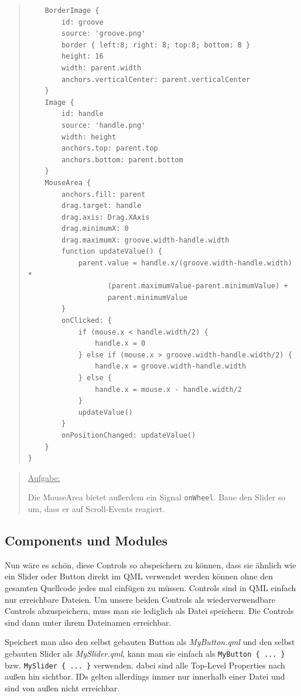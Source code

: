\documentclass[a4paper]{article}
\begin{document}
\begin{quote}
\begin{verbatim}
    BorderImage {
        id: groove
        source: 'groove.png'
        border { left:8; right: 8; top:8; bottom: 8 }
        height: 16
        width: parent.width
        anchors.verticalCenter: parent.verticalCenter
    }
    Image {
        id: handle
        source: 'handle.png'
        width: height
        anchors.top: parent.top
        anchors.bottom: parent.bottom
    }
    MouseArea {
        anchors.fill: parent
        drag.target: handle
        drag.axis: Drag.XAxis
        drag.minimumX: 0
        drag.maximumX: groove.width-handle.width
        function updateValue() {
            parent.value = handle.x/(groove.width-handle.width) *
                   (parent.maximumValue-parent.minimumValue) +
                   parent.minimumValue
        }
        onClicked: {
            if (mouse.x < handle.width/2) {
                handle.x = 0
            } else if (mouse.x > groove.width-handle.width/2) {
                handle.x = groove.width-handle.width
            } else {
                handle.x = mouse.x - handle.width/2
            }
            updateValue()
        }
        onPositionChanged: updateValue()
    }
}
\end{verbatim}
\end{quote}

\begin{quote}
\uline{Aufgabe:}

Die MouseArea bietet außerdem ein Signal \verb~onWheel~. Baue den Slider so um, dass er auf Scroll-Events reagiert.
\end{quote}
\subsection{Components und Modules}
\label{sec-1-4}
Nun wäre es schön, diese Controls so abspeichern zu können, dass sie ähnlich wie ein Slider oder Button direkt im QML verwendet werden können ohne den gesamten Quellcode jedes mal einfügen zu müssen. Controls sind in QML einfach nur erreichbare Dateien. Um unsere beiden Controls als wiederverwendbare Controls abzuspeichern, muss man sie lediglich als Datei speichern. Die Controls sind dann unter ihrem Dateinamen erreichbar.

Speichert man also den selbst gebauten Button als \emph{MyButton.qml} und den selbst gebauten Slider als \emph{MySlider.qml}, kann man sie einfach als \verb~MyButton { ... }~ bzw. \verb~MySlider { ... }~ verwenden. dabei sind alle Top-Level Properties nach außen hin sichtbar. IDs gelten allerdings immer nur innerhalb einer Datei und sind von außen nicht erreichbar.
\end{document}
